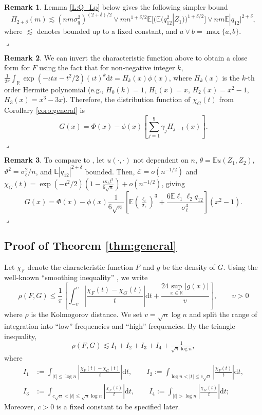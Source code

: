 \documentclass[11pt]{article}
\numberwithin{equation}{section}
\theoremstyle{definition}
\newtheorem{remark_tmp}{Remark}[section]
\newenvironment{remark}
	{ \begin{remark_tmp} 	}
	{ 
		\medskip\hfill{\LARGE$\lrcorner$}
		\end{remark_tmp} 
	}
\newcommand{\E}{\mathbb{E}}
\newcommand{\R}{\mathbb{R}}
\def\ls{\lesssim}
\def\d{\mathrm{d}}
\newcommand{\Center}{\theta}
\newcommand{\Scale}{\vartheta}
\begin{document}
\begin{remark}
    Lemma \ref{L:Q_Lp} below gives the following simpler bound
    \[\Pi_{2+\delta}(m) \ls  (n m\sigma_q^2)^{(2+\delta)/2}\lor mn^{1+\delta/2}\E\big[(\E (q_{12}^2|Z_1))^{1+\delta/2}\big]\lor nm\E|q_{12}|^{2+\delta},\]
    where $\ls$ denotes bounded up to a fixed constant, and $a\lor b=\max\{a,b\}$.
\end{remark} 

\begin{remark}
    We can invert the characteristic function above to obtain a close form for $F$ using the fact that for non-negative integer $k$, $\frac{1}{2\pi}\int_\R \exp{(-\iota tx-t^2/2)} (\iota t)^{k} \d t = H_k(x)\phi(x)$, where $H_k(x)$ is the $k$-th order Hermite polynomial (e.g., $H_0(k)=1$, $H_1(x) = x$, $H_2(x) = x^2-1$, $H_3(x) = x^3 - 3x$). Therefore, the distribution function of $\chi_G(t)$ from Corollary \ref{coro:general} is
    \[G(x) = \Phi(x) - \phi(x)\left[\sum_{j=1}^9 \gamma_j H_{j-1}(x)\right].\]
\end{remark}

\begin{remark}
    To compare to \citet{Jing-Wang_2003_AOS}, let $u(\cdot,\cdot)$ not dependent on $n$, $\Center=\E u(Z_1,Z_2)$, $\Scale^2 =\sigma_\ell^2/n$, and $\E|q_{12}|^{2+\delta}$ bounded. Then, $\mathcal{E}=o(n^{-1/2})$ and $\chi_G(t)=\exp(-t^2/2)\left(1 -\tfrac{\iota \kappa_3t^3}{6\sqrt{n}} \right) + o(n^{-1/2})$, giving
    \[G(x) = \Phi(x) - \phi(x)\frac{1}{6\sqrt{n}}\left[\E\left(\tfrac{\ell_i}{\sigma_\ell}\right)^3 +\frac{6\E \ell_1\ell_2q_{12}}{\sigma_\ell^3}\right](x^2-1).\]
\end{remark}

\subsection{Proof of Theorem \ref{thm:general}}

Let $\chi_F$ denote the characteristic function $F$ and $g$ be the density of $G$.  Using the well-known ``smoothing inequality'' \citep{Bhattacharya-Rao1976_book,Hall1992_book}, we write
\[
 \rho(F,G)  \leq\frac{1}{\pi}\left[ \int_{-\upsilon}^\upsilon\left |\frac{\chi_F(t)-\chi_G(t)}{t}\right|\d t +\frac{24\sup_{x\in\R}|g(x)|}{\upsilon}\right],\qquad \upsilon>0
\]
where $\rho$ is the Kolmogorov distance. We set $v=\sqrt{n}\log n$ and split the range of integration into ``low'' frequencies  and ``high'' frequencies. By the triangle inequality,
\begin{equation}\label{E:inter_bond}
 \rho(F,G) \ls I_1 + I_2 + I_3 + I_4 +\tfrac{1}{\sqrt{n}\log n},
\end{equation}
where
\begin{align*}
I_1&:=\int_{|t|\leq\log n}\left |\frac{\chi_F(t)-\chi_G(t)}{t}\right|\d t, \qquad
I_2:=\int_{\log n<|t|\leq c \sqrt{n}}\left |\frac{\chi_F(t)}{t}\right|\d t, \\
I_3&:=\int_{c \sqrt{n}<|t|\leq \sqrt{n}\log n}\left |\frac{\chi_F(t)}{t}\right|\d t, \qquad
I_4:=\int_{|t|>\log n}\left |\frac{\chi_G(t)}{t}\right|\d t;
\end{align*}
Moreover, $c>0$ is a  fixed constant to be specified later. 
\end{document}
